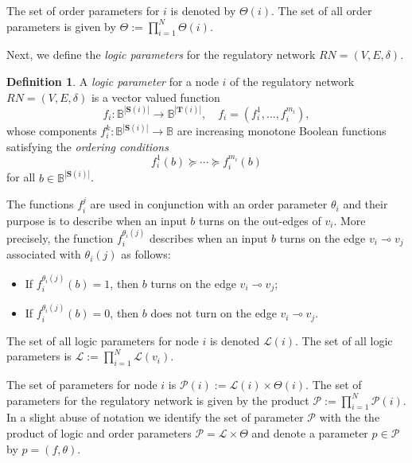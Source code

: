 \documentclass[12pt, notitlepage]{amsart}
\newcommand{\cL}{{\mathcal L}}
\newcommand{\cP}{{\mathcal P}}
\theoremstyle{definition}
\newtheorem{defn}[thm]{Definition}
\newcommand{\Targets}{\mathbf{T}}
\newcommand{\Sources}{\mathbf{S}}
\newcommand{\bbB}{\mathbb{B}}
\begin{document}
  The set of order parameters for $i$ is denoted by $\Theta(i)$. The set of all order parameters is given by $\Theta := \prod_{i=1}^{N} \Theta(i)$.

  Next, we define the \textit{logic parameters} for the regulatory network $RN = (V,E,\delta)$.

  \begin{defn}
    \label{def:fi}
    A \textit{logic parameter} for a node $i$ of the regulatory network $RN = (V,E,\delta)$ is a vector valued function
    \begin{equation}
      \label{eq:logical}
      f_i \colon \bbB^{|\Sources(i)|} \to \bbB^{|\Targets(i)|}, \quad f_i = (f_i^1, \ldots, f_i^{m_i}),
    \end{equation}
    whose components $f_i^k \colon \bbB^{|\Sources(i)|} \to \bbB$ are increasing monotone Boolean functions satisfying the \textit{ordering conditions}
    \begin{equation}
      \label{eq:ordering condition}
      f_i^1(b) \succeq \cdots \succeq f_i^{m_i}(b)
    \end{equation}
    for all $b \in \bbB^{|\Sources(i)|}$.
  \end{defn}

  The functions $f_i^j$ are used in conjunction with an order parameter $\theta_i$ and their purpose is to describe when an input $b$ turns on the out-edges of $v_i$. More precisely, the function $f_i^{\theta_i(j)}$ describes when an input $b$ turns on the edge $v_i \multimap v_j$ associated with $\theta_i(j)$ as follows:
  \begin{itemize}
    \item If $f_i^{\theta_i(j)}(b) = 1$, then $b$ turns on the edge $v_i \multimap v_j$;
    \item If $f_i^{\theta_i(j)}(b) = 0$, then $b$ does not turn on the edge $v_i \multimap v_j$.
  \end{itemize}

  The set of all logic parameters for node $i$ is denoted $\cL(i)$. The set of all logic parameters is $\cL := \prod_{i=1}^{N} \cL(v_i)$.

  The set of parameters for node $i$ is $\cP(i) := \cL(i) \times \Theta(i)$. The set of parameters for the regulatory network is given by the product $\cP := \prod_{i=1}^{N} \cP(i)$. In a slight abuse of notation we identify the set of parameter $\cP$ with the the product of logic and order parameters $\cP = \cL \times \Theta$ and denote a parameter $p \in \cP$ by $p = (f, \theta)$.
\end{document}
